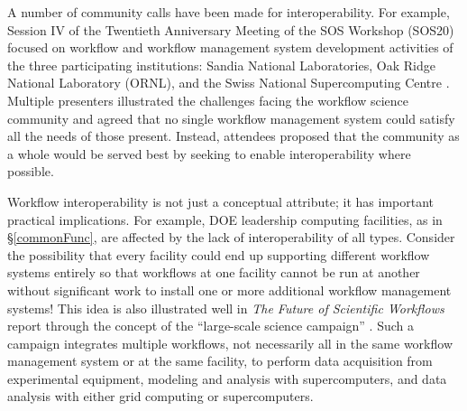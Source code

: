 A number of community calls have been made for interoperability. For example,
Session IV of the Twentieth Anniversary Meeting of the SOS Workshop (SOS20)
focused on workflow and workflow management system development activities of
the three participating institutions: Sandia National Laboratories, Oak Ridge
National Laboratory (ORNL), and the Swiss National Supercomputing Centre
\cite{pack_sos20_2016}. Multiple presenters illustrated the challenges facing
the workflow science community and agreed that no single workflow
management system could satisfy all the needs of those present. Instead,
attendees proposed that the community as a whole would be served best by
seeking to enable interoperability where possible.

Workflow interoperability is not just a conceptual attribute; it has
important practical implications. For example, DOE leadership computing
facilities, as in \S\ref{commonFunc}, are affected by the lack of
interoperability of all types. Consider the possibility that every facility
could end up supporting different workflow systems entirely so that workflows
at one facility cannot be run at another without significant work to install
one or more additional workflow management systems! This idea is also
illustrated well in \textit{The Future of Scientific Workflows} report through
the concept of the ``large-scale science campaign'' \cite{deelman_future_2015}.
Such a campaign integrates multiple workflows, not necessarily all in the same
workflow management system or at the same facility, to perform data
acquisition from experimental equipment, modeling and analysis with
supercomputers, and data analysis with either grid computing or
supercomputers.